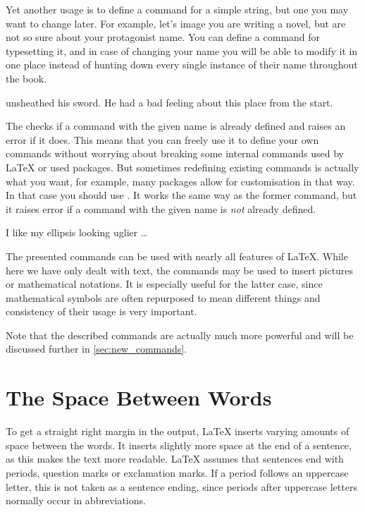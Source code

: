 Yet another usage is to define a command for a simple string, but one you may
want to change later. For example, let's image you are writing a novel, but are
not so sure about your protagonist name. You can define a command for
typesetting it, and in case of changing your name you will be able to modify it
in one place instead of hunting down every single instance of their name
throughout the book.
\begin{example}

\hero{} unsheathed his sword.
He  had a bad feeling about
this place from the start.
\end{example}

The  checks if a command with the given name is already
defined and raises an error if it does. This means that you can freely use it
to define your own commands without worrying about breaking some internal
commands used by \LaTeX{} or used packages. But sometimes redefining existing
commands is actually what you want, for example, many packages allow for
customisation in that way. In that case you should use
. It works the same way as the former command, but it
raises error if a command with the given name is \emph{not} already defined.
\begin{example}

I like my ellipsis looking
uglier \ldots
\end{example}

The presented commands can be used with nearly all features of \LaTeX{}. While
here we have only dealt with text, the commands may be used to insert pictures
or mathematical notations. It is especially useful for the latter case, since
mathematical symbols are often repurposed to mean different things and
consistency of their usage is very important.

Note that the described commands are actually much more powerful and will be
discussed further in \autoref{sec:new_commands}.

\section{The Space Between Words}

To get a straight right margin in the output, \LaTeX{} inserts varying
amounts of space between the words. It inserts slightly more space at
the end of a sentence, as this makes the text more readable.  \LaTeX{}
assumes that sentences end with periods, question marks or exclamation
marks. If a period follows an uppercase letter, this is not taken as a
sentence ending, since periods after uppercase letters normally occur in
abbreviations.

